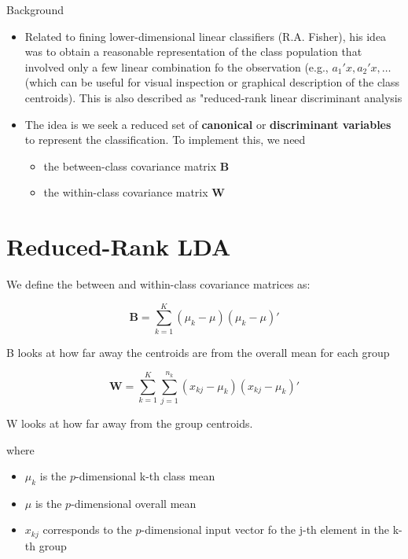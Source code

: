 \documentclass[
]{book}
\begin{document}
Background

\begin{itemize}
\item
  Related to fining lower-dimensional linear classifiers (R.A. Fisher), his idea was to obtain a reasonable representation of the class population that involved only a few linear combination fo the observation (e.g., \(a_1' x, a_2'x, \dots\) (which can be useful for visual inspection or graphical description of the class centroids). This is also described as "reduced-rank linear discriminant analysis \citep[4.3.3]{hastie2001a}
\item
  The idea is we seek a reduced set of \textbf{canonical} or \textbf{discriminant variables} to represent the classification. To implement this, we need

  \begin{itemize}
  \item
    the between-class covariance matrix \(\mathbf{B}\)
  \item
    the within-class covariance matrix \(\mathbf{W}\)
  \end{itemize}
\end{itemize}

\hypertarget{reduced-rank-lda}{%
\section{Reduced-Rank LDA}\label{reduced-rank-lda}}

We define the between and within-class covariance matrices as:

\[
\mathbf{B} = \sum_{k=1}^K (\mu_k - \mu)(\mu_k - \mu)'
\]

B looks at how far away the centroids are from the overall mean for each group

\[
\mathbf{W} = \sum_{k=1}^K \sum_{j=1}^{n_k} (x_{kj} - \mu_k) (x_{kj}- \mu_k)'
\]

W looks at how far away from the group centroids.

where

\begin{itemize}
\item
  \(\mu_k\) is the \(p\)-dimensional k-th class mean
\item
  \(\mu\) is the \(p\)-dimensional overall mean
\item
  \(x_{kj}\) corresponds to the \(p\)-dimensional input vector fo the j-th element in the k-th group
\end{itemize}
\end{document}
